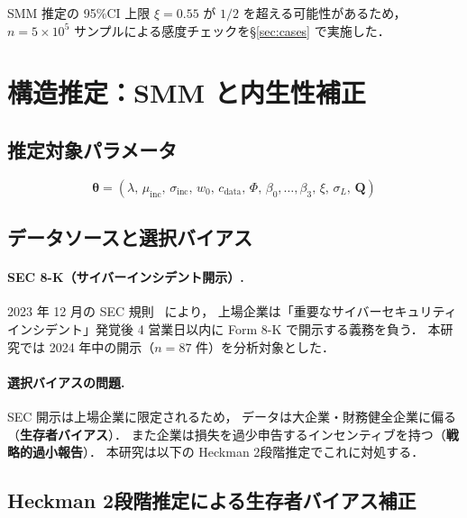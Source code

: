 \documentclass{ipsjlike}
\newcommand{\btheta}{\bm{\theta}}
\begin{document}
\begin{remark}
  SMM 推定の 95\%CI 上限 $\hat{\xi} = 0.55$ が $1/2$ を超える可能性があるため，
  $n = 5 \times 10^5$ サンプルによる感度チェックを§\ref{sec:cases} で実施した．
\end{remark}

\section{構造推定：SMM と内生性補正}
\label{sec:estimation}

\subsection{推定対象パラメータ}

\begin{equation}
  \btheta = (\lambda,\, \mu_{\mathrm{inc}},\, \sigma_{\mathrm{inc}},\,
             w_0,\, c_{\mathrm{data}},\, \Phi,\, \beta_0,\ldots,\beta_3,\,
             \xi,\, \sigma_L,\, \bm{Q})
  \label{eq:theta}
\end{equation}

\subsection{データソースと選択バイアス}

\paragraph{SEC 8-K（サイバーインシデント開示）.}
2023 年 12 月の SEC 規則~\cite{sec2023rule} により，
上場企業は「重要なサイバーセキュリティインシデント」発覚後 4 営業日以内に
Form 8-K で開示する義務を負う．
本研究では 2024 年中の開示（$n = 87$ 件）を分析対象とした．

\paragraph{選択バイアスの問題.}
SEC 開示は上場企業に限定されるため，
データは大企業・財務健全企業に偏る（\textbf{生存者バイアス}）．
また企業は損失を過少申告するインセンティブを持つ（\textbf{戦略的過小報告}）．
本研究は以下の Heckman 2段階推定でこれに対処する．

\subsection{Heckman 2段階推定による生存者バイアス補正}
\end{document}
